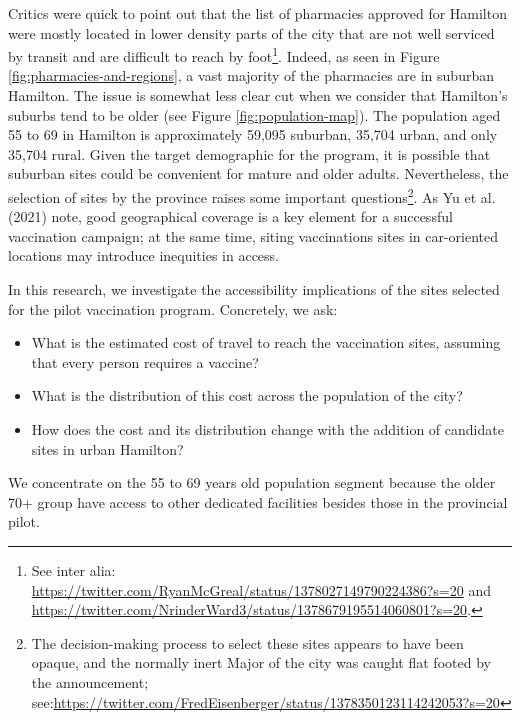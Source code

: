 \documentclass[]{elsarticle} %
\providecommand{\tightlist}{%
  \setlength{\itemsep}{0pt}\setlength{\parskip}{0pt}}
\begin{document}
Critics were quick to point out that the list of pharmacies approved for
Hamilton were mostly located in lower density parts of the city that are
not well serviced by transit and are difficult to reach by
foot\footnote{See inter alia: \url{https://twitter.com/RyanMcGreal/status/1378027149790224386?s=20} and \url{https://twitter.com/NrinderWard3/status/1378679195514060801?s=20}.}.
Indeed, as seen in Figure \ref{fig:pharmacies-and-regions}, a vast
majority of the pharmacies are in suburban Hamilton. The issue is
somewhat less clear cut when we consider that Hamilton's suburbs tend to
be older (see Figure \ref{fig:population-map}). The population aged 55
to 69 in Hamilton is approximately 59,095 suburban, 35,704 urban, and
only 35,704 rural. Given the target demographic for the program, it is
possible that suburban sites could be convenient for mature and older
adults. Nevertheless, the selection of sites by the province raises some
important
questions\footnote{The decision-making process to select these sites appears to have been opaque, and the normally inert Major of the city was caught flat footed by the announcement; see:\url{https://twitter.com/FredEisenberger/status/1378350123114242053?s=20}}.
As Yu et al. (2021) note, good geographical coverage is a key element
for a successful vaccination campaign; at the same time, siting
vaccinations sites in car-oriented locations may introduce inequities in
access.

In this research, we investigate the accessibility implications of the
sites selected for the pilot vaccination program. Concretely, we ask:

\begin{itemize}
\tightlist
\item
  What is the estimated cost of travel to reach the vaccination sites,
  assuming that every person requires a vaccine?
\item
  What is the distribution of this cost across the population of the
  city?
\item
  How does the cost and its distribution change with the addition of
  candidate sites in urban Hamilton?
\end{itemize}

We concentrate on the 55 to 69 years old population segment because the
older 70+ group have access to other dedicated facilities besides those
in the provincial pilot.
\end{document}
